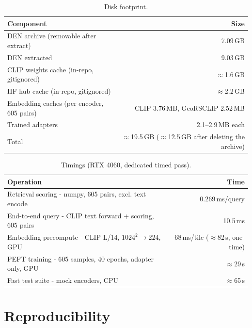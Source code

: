\documentclass{article}
\begin{document}
\begin{table}[H]
    \centering
    \caption{Disk footprint.}
    \label{tab:disk}
    \begin{tabular}{lr}
        \toprule
        \textbf{Component} & \textbf{Size} \\
        \midrule
        DEN archive (removable after extract)        & 7.09\,GB \\
        DEN extracted                                & 9.03\,GB \\
        CLIP weights cache (in-repo, gitignored)     & $\approx$1.6\,GB \\
        HF hub cache (in-repo, gitignored)           & $\approx$2.2\,GB \\
        Embedding caches (per encoder, 605 pairs)    & CLIP 3.76\,MB, GeoRSCLIP 2.52\,MB \\
        Trained adapters                             & 2.1--2.9\,MB each \\
        Total                               & $\approx$19.5\,GB ($\approx$12.5\,GB after deleting the archive) \\
        \bottomrule
    \end{tabular}
\end{table}

\begin{table}[H]
    \centering
    \caption{Timings (RTX 4060, dedicated timed pass).}
    \label{tab:timings}
    \begin{tabular}{lr}
        \toprule
        \textbf{Operation} & \textbf{Time} \\
        \midrule
        Retrieval scoring - numpy, 605 pairs, excl. text encode & 0.269\,ms/query \\
        End-to-end query - CLIP text forward + scoring, 605 pairs & 10.5\,ms \\
        Embedding precompute - CLIP L/14, $1024^2 \rightarrow 224$, GPU & 68\,ms/tile ($\approx$82\,s, one-time) \\
        PEFT training - 605 samples, 40 epochs, adapter only, GPU & $\approx$29\,s \\
        Fast test suite - mock encoders, CPU & $\approx$65\,s \\
        \bottomrule
    \end{tabular}
\end{table}


\section{Reproducibility}
\label{sec:repro}
\end{document}
